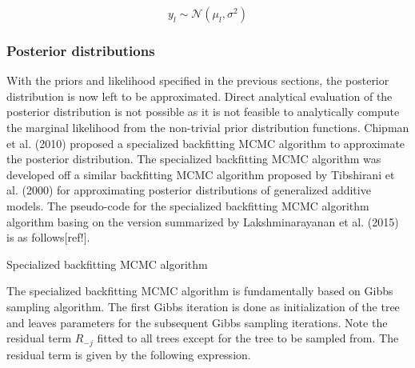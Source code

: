 \documentclass{usiinftr}
\begin{document}
\begin{equation}
y_l \sim \mathcal{N}(\mu_l, \sigma^2)
\end{equation}



\subsubsection{Posterior distributions}
With the priors and likelihood specified in the previous sections, the posterior distribution is now left to be approximated. Direct analytical evaluation of the posterior distribution is not possible as it is not feasible to analytically compute the marginal likelihood from the non-trivial prior distribution functions. Chipman et al. (2010) proposed a specialized backfitting MCMC algorithm to approximate the posterior distribution. The specialized backfitting MCMC algorithm was developed off a similar backfitting MCMC algorithm proposed by Tibshirani et al. (2000) for approximating posterior distributions of generalized additive models. The pseudo-code for the specialized backfitting MCMC algorithm algorithm basing on the version summarized by Lakshminarayanan et al. (2015) is as follows[ref!].

\begin{algorithm}[h]
  \caption{Specialized backfitting MCMC algorithm} \label{algSpc}
  \begin{algorithmic}[1]
    \Statex
    \EndFor
    	\EndFor
    \EndFor
    \EndFunction
  \end{algorithmic}
\end{algorithm}

The specialized backfitting MCMC algorithm is fundamentally based on Gibbs sampling algorithm. The first Gibbs iteration is done as initialization of the tree and leaves parameters for the subsequent Gibbs sampling iterations. Note the residual term $R_{-j}$ fitted to all trees except for the tree to be sampled from. The residual term is given by the following expression.
\end{document}
